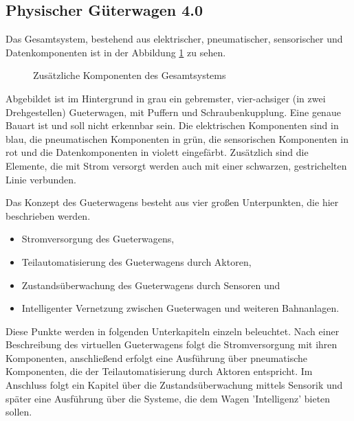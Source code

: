 \subsection{Physischer Güterwagen 4.0}
Das Gesamtsystem, bestehend aus elektrischer, pneumatischer, sensorischer und Datenkomponenten ist in der Abbildung \ref{fig:GesSys} zu sehen.\par
    \begin{figure}[hbt]
        \centering
    
        \caption{Zusätzliche Komponenten des Gesamtsystems}
        \label{fig:GesSys}
    \end{figure}
Abgebildet ist im Hintergrund in grau ein gebremster, vier-achsiger (in zwei Drehgestellen) \gls{Gueterwagen}, mit Puffern und Schraubenkupplung. Eine genaue Bauart ist und soll nicht erkennbar sein. Die elektrischen Komponenten sind in blau, die pneumatischen Komponenten in grün, die sensorischen Komponenten in rot und die Datenkomponenten in violett eingefärbt. Zusätzlich sind die Elemente, die mit Strom versorgt werden auch mit einer schwarzen, gestrichelten Linie verbunden.\par
Das Konzept des \gls{Gueterwagen}s besteht aus vier großen Unterpunkten, die hier beschrieben werden.
\begin{itemize}
    \item Stromversorgung des \gls{Gueterwagen}s,
    \item Teilautomatisierung des \gls{Gueterwagen}s durch Aktoren,
    \item Zustandsüberwachung des \gls{Gueterwagen}s durch Sensoren und
    \item Intelligenter Vernetzung zwischen \gls{Gueterwagen} und weiteren Bahnanlagen.
\end{itemize}
Diese Punkte werden in folgenden Unterkapiteln einzeln beleuchtet. Nach einer Beschreibung des virtuellen \gls{Gueterwagen}s folgt die Stromversorgung mit ihren Komponenten, anschließend erfolgt eine Ausführung über pneumatische Komponenten, die der Teilautomatisierung durch Aktoren entspricht. Im Anschluss folgt ein Kapitel über die Zustandsüberwachung mittels Sensorik und später eine Ausführung über die Systeme, die dem Wagen 'Intelligenz' bieten sollen.

